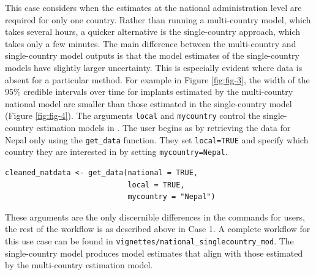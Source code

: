 This case considers when the estimates at the national administration level are required for only one country. Rather than running a multi-country model, which takes several hours, a quicker alternative is the single-country approach, which takes only a few minutes. The main difference between the multi-country and single-country model outputs is that the model estimates of the single-country models have slightly larger uncertainty. This is especially evident where data is absent for a particular method. For example in Figure \ref{fig:fig-3}, the width of the 95\% credible intervals over time for implants estimated by the multi-country national model are smaller than those estimated in the single-country model (Figure \ref{fig:fig-4}). The arguments \texttt{local} and \texttt{mycountry} control the single-country estimation models in . The user begins as by retrieving the data for Nepal only using the \texttt{get\_data} function. They set \texttt{local=TRUE} and specify which country they are interested in by setting \texttt{mycountry=Nepal}.

\begin{verbatim}
cleaned_natdata <- get_data(national = TRUE, 
                            local = TRUE,
                            mycountry = "Nepal")
\end{verbatim}

These arguments are the only discernible differences in the commands for users, the rest of the workflow is as described above in Case 1. A complete workflow for this use case can be found in \texttt{vignettes/national\_singlecountry\_mod}. The single-country model produces model estimates that align with those estimated by the multi-country estimation model.



